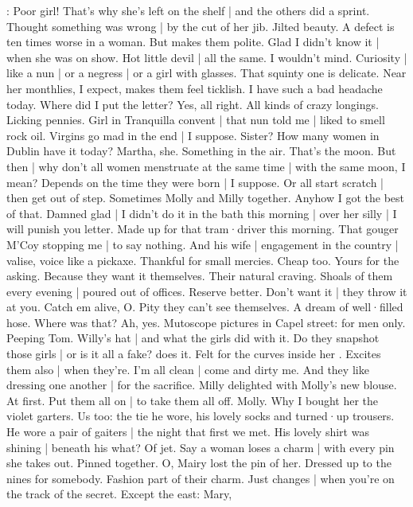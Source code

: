 \Bloom:
Poor girl!
That's why
she's left on the shelf |
and the others did a sprint.
Thought something was wrong |
by the cut of her jib.
Jilted beauty.
A defect is ten times worse in a woman.
But makes them polite.
Glad I didn't know it |
when she was on show.
Hot little devil |
all the same.
I wouldn't mind.
Curiosity |
like a nun |
or a negress |
or a girl with glasses.
That squinty one is delicate.
Near her monthlies,
I expect,
makes them feel ticklish.
I have such a bad headache today.
Where did I put the letter?
Yes,
all right.
All kinds of crazy longings.
Licking pennies.%
Girl in Tranquilla convent |
that nun told me |
liked to smell rock oil.
Virgins go mad in the end |
I suppose.
Sister?
How many women in Dublin have it today?
Martha,
she.
Something in the air.
That's the moon.
But then |
why don't all women menstruate
at the same time |
with the same moon,
I mean?
Depends on the time they were born |
I suppose.
Or all start scratch |
then get out of step.
Sometimes Molly and Milly together.
Anyhow I got the best of that.
Damned glad |
I didn't do it in the bath this morning |
over her silly |
I will punish you letter.
Made up for that tram·driver this morning.
That gouger M'Coy stopping me |
to say nothing.
And his wife |
engagement in the country |
valise,
voice like a pickaxe.
Thankful for small mercies.
Cheap too.
Yours for the asking.%
Because they want it themselves.
Their natural craving.
Shoals of them every evening |
poured out of offices.
Reserve better.
Don't want it |
they throw it at you.
Catch em alive,
O.
Pity they can't see themselves.
A dream of well·filled hose.
Where was that?
Ah,
yes.
Mutoscope pictures in Capel street:
for men only.
Peeping Tom.
Willy's hat |
and what the girls did with it.
Do they snapshot those girls |
or is it all a fake?
 does it.
Felt for the curves inside her .
Excites them also |
when they're.
I'm all clean |
come and dirty me.
And they like dressing one another |
for the sacrifice.
Milly delighted with Molly's new blouse.
At first.
Put them all on |
to take them all off.
Molly.
Why I bought her the violet garters.%
Us too:
the tie he wore,
his lovely socks and turned·up trousers.
He wore a pair of gaiters |
the night that first we met.
His lovely shirt was shining |
beneath his what?
Of jet.
Say a woman loses a charm |
with every pin she takes out.
Pinned together.
O,
Mairy lost the pin of her.
Dressed up to the nines for somebody.
Fashion part of their charm.
Just changes |
when you're on the track of the secret.
Except the east:
Mary,
